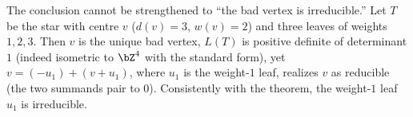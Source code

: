 \begin{rem}[Sharpness]
The conclusion cannot be strengthened to ``the bad vertex is irreducible.''  Let $T$ be the
star with centre $v$ ($d(v)=3$, $w(v)=2$) and three leaves of weights $1,2,3$.  Then $v$ is
the unique bad vertex, $L(T)$ is positive definite of determinant $1$ (indeed isometric to
$\bZ^4$ with the standard form), yet $v=(-u_1)+(v+u_1)$, where $u_1$ is the weight-$1$ leaf,
realizes $v$ as reducible (the two summands pair to $0$).  Consistently with the theorem, the
weight-$1$ leaf $u_1$ is irreducible.
\end{rem}
